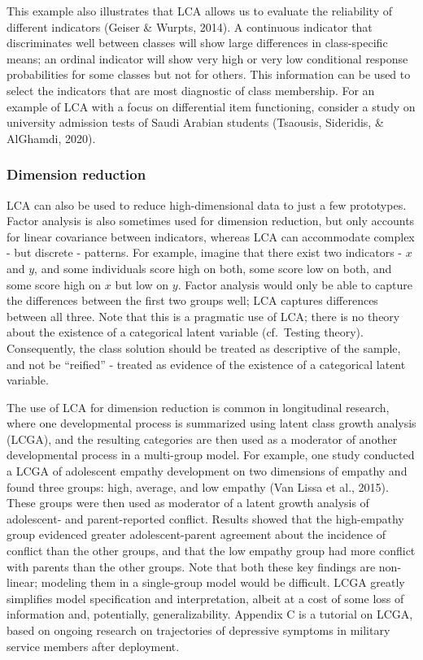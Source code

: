 \documentclass[
  ,man,floatsintext]{apa6}
\begin{document}
This example also illustrates that LCA allows us to evaluate the
reliability of different indicators (Geiser \& Wurpts, 2014).
A
continuous indicator that discriminates well between classes will show
large differences in class-specific means; an ordinal indicator will
show very high or very low conditional response probabilities for some
classes but not for others. This information can be used to select the
indicators that are most diagnostic of class membership. For an example
of LCA with a focus on differential item functioning, consider a study
on university admission tests of Saudi Arabian students
(Tsaousis, Sideridis, \& AlGhamdi, 2020).

\hypertarget{dimension-reduction}{%
\subsubsection{Dimension reduction}\label{dimension-reduction}}

LCA can also be used to reduce high-dimensional data to just a few
prototypes. Factor analysis is also sometimes used for dimension
reduction, but only accounts for linear covariance between indicators,
whereas LCA can accommodate complex - but discrete - patterns. For
example, imagine that there exist two indicators - \(x\) and \(y\), and some
individuals score high on both, some score low on both, and some score
high on \(x\) but low on \(y\). Factor analysis would only be able to
capture the differences between the first two groups well; LCA captures
differences between all three. Note that this is a pragmatic use of LCA;
there is no theory about the existence of a categorical latent variable
(cf.~Testing theory). Consequently, the class solution should be treated
as descriptive of the sample, and not be ``reified'' - treated as evidence
of the existence of a categorical latent variable.

The use of LCA for dimension reduction is common in longitudinal
research, where one developmental process is summarized using latent
class growth analysis (LCGA), and the resulting categories are then used
as a moderator of another developmental process in a multi-group model.
For example, one study conducted a LCGA of adolescent empathy
development on two dimensions of empathy and found three groups: high,
average, and low empathy (Van Lissa et al., 2015). These groups were
then used as moderator of a latent growth analysis of adolescent- and
parent-reported conflict. Results showed that the high-empathy group
evidenced greater adolescent-parent agreement about the incidence of
conflict than the other groups, and that the low empathy group had more
conflict with parents than the other groups. Note that both these key
findings are non-linear; modeling them in a single-group model would be
difficult. LCGA greatly simplifies model specification and
interpretation, albeit at a cost of some loss of information and,
potentially, generalizability. Appendix C is a tutorial on LCGA, based
on ongoing research on trajectories of depressive symptoms in military
service members after deployment.
\end{document}
